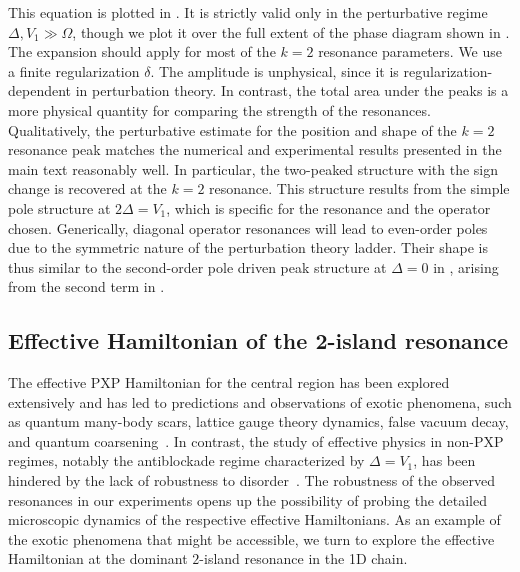 \documentclass[english,floatfix,twocolumn,showpacs, aps, prx, reprint, superscriptaddress, longbibliography]{revtex4-2}
\begin{document}
This equation is plotted in . It is strictly valid only in the perturbative regime $\Delta, V_1 \gg \Omega$, though we plot it over the full extent of the phase diagram shown in . The expansion should apply for most of the $k=2$ resonance parameters. We use a finite regularization $\delta$. The amplitude is unphysical, since it is regularization-dependent in perturbation theory. In contrast, the total area under the peaks is a more physical quantity for comparing the strength of the resonances. Qualitatively, the perturbative estimate for the position and shape of the $k=2$ resonance peak matches the numerical and experimental results presented in the main text reasonably well. In particular, the two-peaked structure with the sign change is recovered at the $k=2$ resonance. This structure results from the simple pole structure at $2\Delta = V_1$, which is specific for the resonance and the operator chosen. Generically, diagonal operator resonances will lead to even-order poles due to the symmetric nature of the perturbation theory ladder. Their shape is thus similar to the second-order pole driven peak structure at $\Delta=0$ in , arising from the second term in .

\subsection{Effective Hamiltonian of the 2-island resonance} 
\label{supp:sec:resonances_effective}

The effective PXP Hamiltonian for the central region has been explored extensively and has led to predictions and observations of exotic phenomena, such as quantum many-body scars, lattice gauge theory dynamics, false vacuum decay, and quantum coarsening~\cite{Bernien:2017, Bluvstein:2021, Surace:2020, GonzalezCuadra:2024, Darbha:2024a, Darbha:2024b, Manovitz:2025}. In contrast, the study of effective physics in non-PXP regimes, notably the antiblockade regime characterized by $\Delta = V_1$, has been hindered by the lack of robustness to disorder~\cite{Mattioli:2015, Liu:2022, Marcuzzi:2017}. The robustness of the observed resonances in our experiments opens up the possibility of probing the detailed microscopic dynamics of the respective effective Hamiltonians. As an example of the exotic phenomena that might be accessible, we turn to explore the effective Hamiltonian at the dominant $2$-island resonance in the 1D chain.
\end{document}

